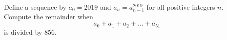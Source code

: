 Define a sequence by $a_0=2019$ and $a_n=a_{n-1}^{2019}$ for all positive integers $n$. Compute the remainder when \[a_0+a_1+a_2+\dots+a_{51}\] is divided by $856$.
